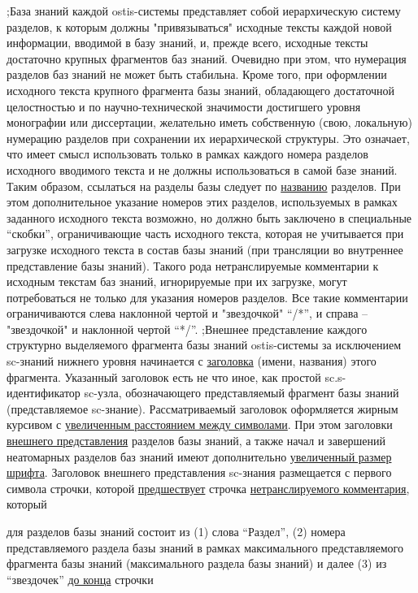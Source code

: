\begin{SCn}
{;База знаний каждой ostis-системы представляет собой иерархическую систему разделов, к которым должны "привязываться"{} исходные тексты каждой новой информации, вводимой в базу знаний, и, прежде всего, исходные тексты достаточно крупных фрагментов баз знаний.  Очевидно при этом, что нумерация разделов баз знаний не может быть стабильна. Кроме того, при оформлении исходного текста крупного фрагмента базы знаний, обладающего достаточной целостностью и по научно-технической значимости достигшего уровня монографии или диссертации, желательно иметь собственную (свою, локальную) нумерацию разделов при сохранении их иерархической структуры. Это означает, что имеет смысл использовать только в рамках каждого номера разделов исходного вводимого текста и не должны использоваться в самой базе знаний. Таким образом, ссылаться на разделы базы следует по \uline{названию} разделов. При этом дополнительное указание номеров этих разделов, используемых в рамках заданного исходного текста возможно, но должно быть заключено в специальные ``скобки'', ограничивающие часть исходного текста, которая не учитывается при загрузке исходного текста в состав базы знаний (при трансляции во внутреннее представление базы знаний). Такого рода нетранслируемые комментарии к исходным текстам баз знаний, игнорируемые при их загрузке, могут потребоваться не только для указания номеров разделов. Все такие комментарии ограничиваются слева наклонной чертой и "звездочкой"{} ``/*'', и справа --  "звездочкой"{} и наклонной чертой ``*/''.
;Внешнее представление каждого структурно выделяемого фрагмента базы знаний ostis-системы за исключением sc-знаний нижнего уровня начинается с \uline{заголовка} (имени, названия) этого фрагмента. Указанный заголовок есть не что иное, как простой sc.s-идентификатор sc-узла, обозначающего представляемый фрагмент базы знаний (представляемое sc-знание). Рассматриваемый заголовок оформляется жирным курсивом с \uline{увеличенным расстоянием между символами}. При этом заголовки \uline{внешнего представления} разделов базы знаний, а также начал и завершений неатомарных разделов баз знаний имеют дополнительно \uline{увеличенный размер шрифта}. Заголовок внешнего представления sc-знания размещается с первого символа строчки, которой \uline{предшествует} строчка \uline{нетранслируемого комментария}, который 
\begin{scnitemize}
    \item для разделов базы знаний состоит из (1) слова ``Раздел'', (2) номера представляемого раздела базы знаний в рамках максимального представляемого фрагмента базы знаний (максимального раздела базы знаний) и далее (3) из ``звездочек'' \uline{до конца} строчки

\end{scnitemize}}
\end{SCn}
